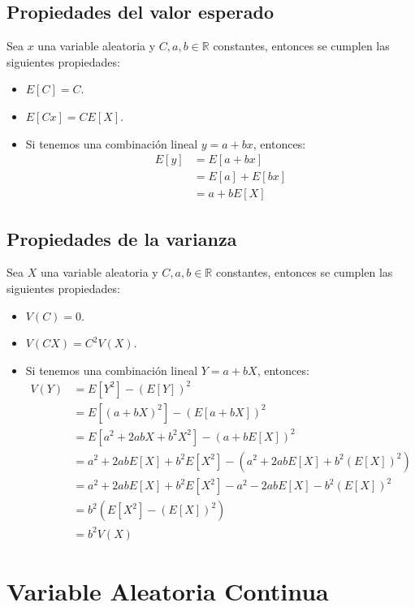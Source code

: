 \documentclass{article}
\newcommand{\R}{\mathbb{R}}
\theoremstyle{definition}
\theoremstyle{plain}
\theoremstyle{remark}
\begin{document}
\subsection{Propiedades del valor esperado}

Sea $x$ una variable aleatoria y $C, a, b \in \R$ constantes, entonces se cumplen las siguientes propiedades:

\begin{itemize}
    \item $E[C] = C$.
    \item $E[Cx] = C E[X]$.
    \item Si tenemos una combinación lineal $y = a + b x$, entonces:
      \begin{align*}
      E[y] &= E[a + b x] \\
      &= E[a] + E[b x] \\
      &= a + b E[X]
      \end{align*}
\end{itemize}

\subsection{Propiedades de la varianza}
Sea $X$ una variable aleatoria y $C, a, b \in \R$ constantes, entonces se cumplen las siguientes propiedades:

\begin{itemize}
    \item $V(C) = 0$.
    \item $V(CX) = C^2 V(X)$.
    \item Si tenemos una combinación lineal $Y = a + bX $, entonces:
      \begin{align*}
      V(Y) &= E[Y^2] - (E[Y])^2 \\
      &= E[(a + bX)^2] - (E[a + bX])^2 \\
      &= E[a^2 + 2abX + b^2 X^2] - (a + b E[X])^2 \\
      &= a^2 + 2ab E[X] + b^2 E[X^2] - (a^2 + 2ab E[X] + b^2 (E[X])^2) \\
      &= a^2 + 2ab E[X] + b^2 E[X^2] - a^2 - 2ab E[X] - b^2 (E[X])^2 \\
      &= b^2 (E[X^2] - (E[X])^2) \\
      &= b^2 V(X)
      \end{align*}
\end{itemize}

\section{Variable Aleatoria Continua}
\end{document}
